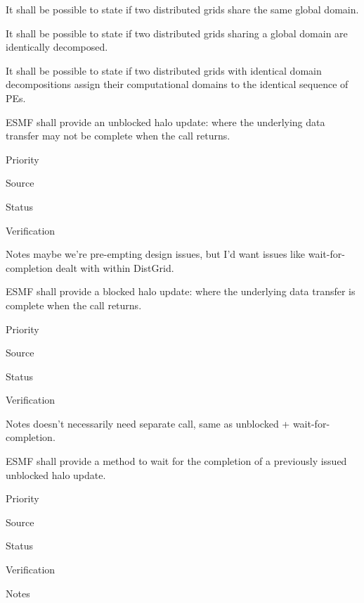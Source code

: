 

It shall be possible to state if two distributed grids share the same
global domain.


It shall be possible to state if two distributed grids sharing a
global domain are identically decomposed.


It shall be possible to state if two distributed grids with identical
domain decompositions assign their computational domains to the
identical sequence of PEs.

 \label{DG:halo}


ESMF shall provide an unblocked halo update: where the underlying
data transfer may not be complete when the call returns.

\begin{reqlist}
\item[Priority]
\item[Source]
\item[Status]
\item[Verification]
\item[Notes] maybe we're pre-empting design issues, but I'd want
  issues like wait-for-completion dealt with within DistGrid.
\end{reqlist}


ESMF shall provide a blocked halo update: where the underlying
data transfer is complete when the call returns.

\begin{reqlist}
\item[Priority]
\item[Source]
\item[Status]
\item[Verification]
\item[Notes] doesn't necessarily need separate call, same as unblocked
  + wait-for-completion.
\end{reqlist}


ESMF shall provide a method to wait for the completion of a previously
issued unblocked halo update.

\begin{reqlist}
\item[Priority]
\item[Source]
\item[Status]
\item[Verification]
\item[Notes]
\end{reqlist}

